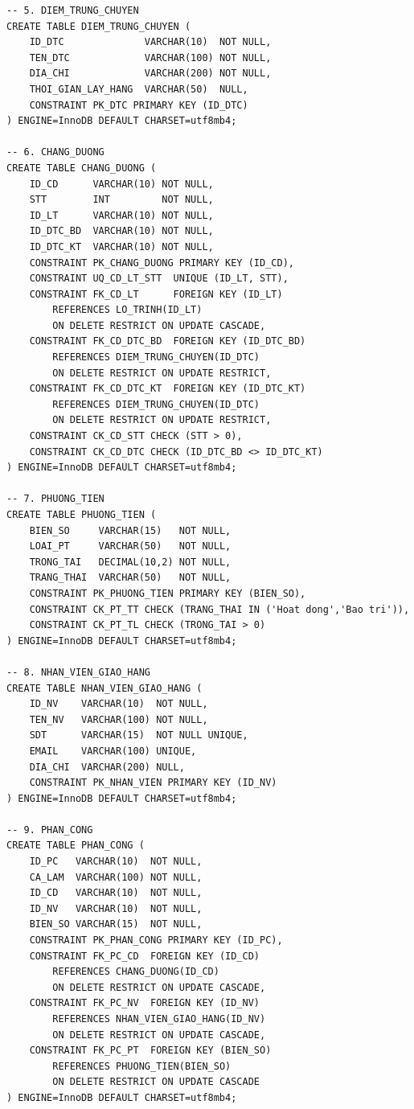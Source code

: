 \documentclass[11pt]{report}
\begin{document}
\begin{verbatim}
-- 5. DIEM_TRUNG_CHUYEN
CREATE TABLE DIEM_TRUNG_CHUYEN (
    ID_DTC              VARCHAR(10)  NOT NULL,
    TEN_DTC             VARCHAR(100) NOT NULL,
    DIA_CHI             VARCHAR(200) NOT NULL,
    THOI_GIAN_LAY_HANG  VARCHAR(50)  NULL,
    CONSTRAINT PK_DTC PRIMARY KEY (ID_DTC)
) ENGINE=InnoDB DEFAULT CHARSET=utf8mb4;

-- 6. CHANG_DUONG
CREATE TABLE CHANG_DUONG (
    ID_CD      VARCHAR(10) NOT NULL,
    STT        INT         NOT NULL,
    ID_LT      VARCHAR(10) NOT NULL,
    ID_DTC_BD  VARCHAR(10) NOT NULL,
    ID_DTC_KT  VARCHAR(10) NOT NULL,
    CONSTRAINT PK_CHANG_DUONG PRIMARY KEY (ID_CD),
    CONSTRAINT UQ_CD_LT_STT  UNIQUE (ID_LT, STT),
    CONSTRAINT FK_CD_LT      FOREIGN KEY (ID_LT)
        REFERENCES LO_TRINH(ID_LT)
        ON DELETE RESTRICT ON UPDATE CASCADE,
    CONSTRAINT FK_CD_DTC_BD  FOREIGN KEY (ID_DTC_BD)
        REFERENCES DIEM_TRUNG_CHUYEN(ID_DTC)
        ON DELETE RESTRICT ON UPDATE RESTRICT,
    CONSTRAINT FK_CD_DTC_KT  FOREIGN KEY (ID_DTC_KT)
        REFERENCES DIEM_TRUNG_CHUYEN(ID_DTC)
        ON DELETE RESTRICT ON UPDATE RESTRICT,
    CONSTRAINT CK_CD_STT CHECK (STT > 0),
    CONSTRAINT CK_CD_DTC CHECK (ID_DTC_BD <> ID_DTC_KT)
) ENGINE=InnoDB DEFAULT CHARSET=utf8mb4;

-- 7. PHUONG_TIEN
CREATE TABLE PHUONG_TIEN (
    BIEN_SO     VARCHAR(15)   NOT NULL,
    LOAI_PT     VARCHAR(50)   NOT NULL,
    TRONG_TAI   DECIMAL(10,2) NOT NULL,
    TRANG_THAI  VARCHAR(50)   NOT NULL,
    CONSTRAINT PK_PHUONG_TIEN PRIMARY KEY (BIEN_SO),
    CONSTRAINT CK_PT_TT CHECK (TRANG_THAI IN ('Hoat dong','Bao tri')),
    CONSTRAINT CK_PT_TL CHECK (TRONG_TAI > 0)
) ENGINE=InnoDB DEFAULT CHARSET=utf8mb4;

-- 8. NHAN_VIEN_GIAO_HANG
CREATE TABLE NHAN_VIEN_GIAO_HANG (
    ID_NV    VARCHAR(10)  NOT NULL,
    TEN_NV   VARCHAR(100) NOT NULL,
    SDT      VARCHAR(15)  NOT NULL UNIQUE,
    EMAIL    VARCHAR(100) UNIQUE,
    DIA_CHI  VARCHAR(200) NULL,
    CONSTRAINT PK_NHAN_VIEN PRIMARY KEY (ID_NV)
) ENGINE=InnoDB DEFAULT CHARSET=utf8mb4;

-- 9. PHAN_CONG
CREATE TABLE PHAN_CONG (
    ID_PC   VARCHAR(10)  NOT NULL,
    CA_LAM  VARCHAR(100) NOT NULL,
    ID_CD   VARCHAR(10)  NOT NULL,
    ID_NV   VARCHAR(10)  NOT NULL,
    BIEN_SO VARCHAR(15)  NOT NULL,
    CONSTRAINT PK_PHAN_CONG PRIMARY KEY (ID_PC),
    CONSTRAINT FK_PC_CD  FOREIGN KEY (ID_CD)
        REFERENCES CHANG_DUONG(ID_CD)
        ON DELETE RESTRICT ON UPDATE CASCADE,
    CONSTRAINT FK_PC_NV  FOREIGN KEY (ID_NV)
        REFERENCES NHAN_VIEN_GIAO_HANG(ID_NV)
        ON DELETE RESTRICT ON UPDATE CASCADE,
    CONSTRAINT FK_PC_PT  FOREIGN KEY (BIEN_SO)
        REFERENCES PHUONG_TIEN(BIEN_SO)
        ON DELETE RESTRICT ON UPDATE CASCADE
) ENGINE=InnoDB DEFAULT CHARSET=utf8mb4;


\end{verbatim}
\end{document}

